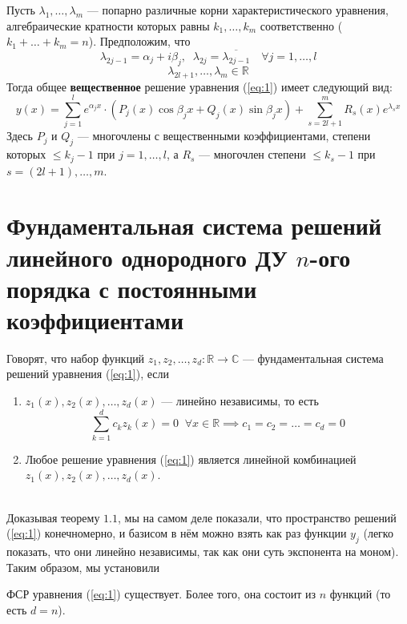 \documentclass[11pt]{article}
\begin{document}
\begin{theorem}
    Пусть $\lambda_1, \ldots, \lambda_m$ --- попарно различные корни характеристического уравнения, алгебраические кратности которых равны $k_1, \ldots, k_m$ соответственно ($k_1 + \ldots + k_m = n$). Предположим, что 
    \[\lambda_{2j - 1} = \alpha_j + i\beta_j, \; \; \lambda_{2j} = \overline{\lambda_{2j - 1}} \quad \forall j = 1, \ldots, l\]
    \[\lambda_{2l + 1}, \ldots, \lambda_m \in \mathbb{R}\]
    Тогда общее \textbf{вещественное} решение уравнения (\ref{eq:1}) имеет следующий вид:
    \[y(x) = \sum_{j = 1}^l e^{\alpha_j x} \cdot (P_j(x) \cos \beta_j x + Q_j(x) \sin \beta_j x) + \sum_{s = 2l + 1}^m R_s(x) e^{\lambda_s x}\]
    Здесь $P_j$ и $Q_j$ --- многочлены с вещественными коэффициентами, степени которых $\leq k_j - 1$ при $j = 1, \ldots, l$, а $R_s$ --- многочлен степени $\leq k_s - 1$ при $s = (2l + 1), \ldots, m$.
\end{theorem}

\section{Фундаментальная система решений линейного однородного ДУ $n$-ого порядка с постоянными коэффициентами}

\begin{definition}
    Говорят, что набор функций $z_1, z_2, \ldots, z_d \colon \mathbb{R} \to \mathbb{C}$ --- фундаментальная система решений уравнения (\ref{eq:1}), если
    \begin{enumerate}
        \item $z_1(x), z_2(x), \ldots, z_d(x)$ --- линейно независимы, то есть
        \[\sum_{k = 1}^d c_k z_k(x) = 0 \; \; \forall x \in \mathbb{R} \implies c_1 = c_2 = \ldots = c_d = 0\]
        \item Любое решение уравнения (\ref{eq:1}) является линейной комбинацией $z_1(x), z_2(x), \ldots, z_d(x)$.
    \end{enumerate}
\end{definition} \leavevmode
\\
Доказывая теорему $1.1$, мы на самом деле показали, что пространство решений (\ref{eq:1}) конечномерно, и базисом в нём можно взять как раз функции $y_j$ (легко показать, что они линейно независимы, так как они суть экспонента на моном). Таким образом, мы установили

\begin{consequence}
    ФСР уравнения (\ref{eq:1}) существует. Более того, она состоит из $n$ функций (то есть $d = n$).
\end{consequence}
\end{document}
